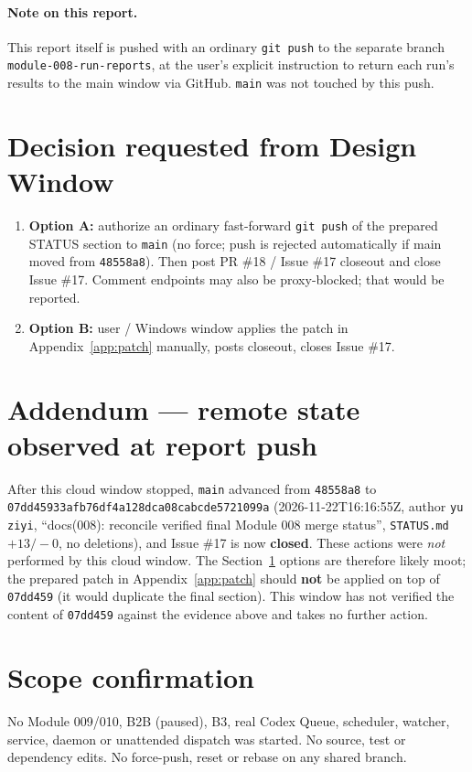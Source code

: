 \documentclass[11pt,a4paper]{article}
\newcommand{\sha}[1]{\texttt{\small #1}}
\begin{document}
\paragraph{Note on this report.} This report itself is pushed with an ordinary \texttt{git push} to the separate branch \texttt{module-008-run-reports}, at the user's explicit instruction to return each run's results to the main window via GitHub. \texttt{main} was not touched by this push.

\section{Decision requested from Design Window}\label{sec:decision}
\begin{enumerate}
  \item \textbf{Option A:} authorize an ordinary fast-forward \texttt{git push} of the prepared STATUS section to \texttt{main} (no force; push is rejected automatically if main moved from \sha{48558a8}). Then post PR \#18 / Issue \#17 closeout and close Issue \#17. Comment endpoints may also be proxy-blocked; that would be reported.
  \item \textbf{Option B:} user / Windows window applies the patch in Appendix~\ref{app:patch} manually, posts closeout, closes Issue \#17.
\end{enumerate}

\section{Addendum --- remote state observed at report push}
After this cloud window stopped, \texttt{main} advanced from \sha{48558a8} to \sha{07dd45933afb76df4a128dca08cabcde5721099a} (2026-11-22T16:16:55Z, author \texttt{yu ziyi}, ``docs(008): reconcile verified final Module 008 merge status'', \texttt{STATUS.md} $+13/-0$, no deletions), and Issue \#17 is now \textbf{closed}. These actions were \emph{not} performed by this cloud window. The Section~\ref{sec:decision} options are therefore likely moot; the prepared patch in Appendix~\ref{app:patch} should \textbf{not} be applied on top of \sha{07dd459} (it would duplicate the final section). This window has not verified the content of \sha{07dd459} against the evidence above and takes no further action.

\section{Scope confirmation}
No Module 009/010, B2B (paused), B3, real Codex Queue, scheduler, watcher, service, daemon or unattended dispatch was started. No source, test or dependency edits. No force-push, reset or rebase on any shared branch.
\end{document}
